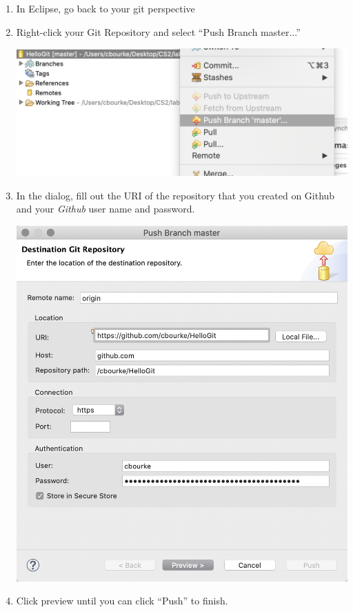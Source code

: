 \documentclass[12pt]{scrartcl}
\begin{document}
\begin{enumerate}
  \item In Eclipse, go back to your git perspective
  \item Right-click your Git Repository and select ``Push Branch master...''
   \begin{center}
	 \includegraphics[scale=0.45]{./hack1.0-files/eclipsePush}
   \end{center}
  \item In the dialog, fill out the URI of the repository that you created
  on Github and your \emph{Github} user name and password.
   \begin{center}
	 \includegraphics[scale=0.45]{./hack1.0-files/eclipsePushDialog}
   \end{center}
  \item Click preview until you can click ``Push'' to finish.
\end{enumerate}
  
\end{document}

